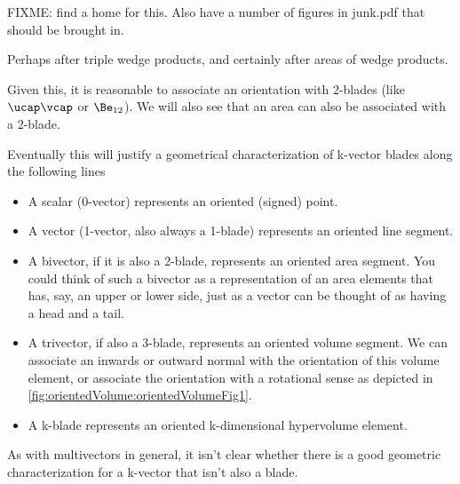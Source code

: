 %
%
FIXME: find a home for this.  Also have a number of figures in junk.pdf that should be brought in.

Perhaps after triple wedge products, and certainly after areas of wedge products.

Given this, it is reasonable to associate an orientation with 2-blades (like \( \ucap \vcap \) or \( \Be_{12} \)).
We will also see that an area can also be associated with a 2-blade.

Eventually this will justify a geometrical characterization of k-vector blades along the following lines

\begin{itemize}
\item A scalar (0-vector) represents an oriented (signed) point.
\item A vector (1-vector, also always a 1-blade) represents an oriented line segment.
\item A bivector, if it is also a 2-blade, represents an oriented area segment.  You could think of such a bivector as a representation of an area elements that has, say, an upper or lower side, just as a vector can be thought of as having a head and a tail.
\item A trivector, if also a 3-blade, represents an oriented volume segment.  We can associate an inwards or outward normal with the orientation of this volume element, or associate the orientation with a rotational sense as depicted in
\cref{fig:orientedVolume:orientedVolumeFig1}.
\item A k-blade represents an oriented k-dimensional hypervolume element.
\end{itemize}

As with multivectors in general, it isn't clear whether there is a good geometric characterization for a k-vector that isn't also a blade.


